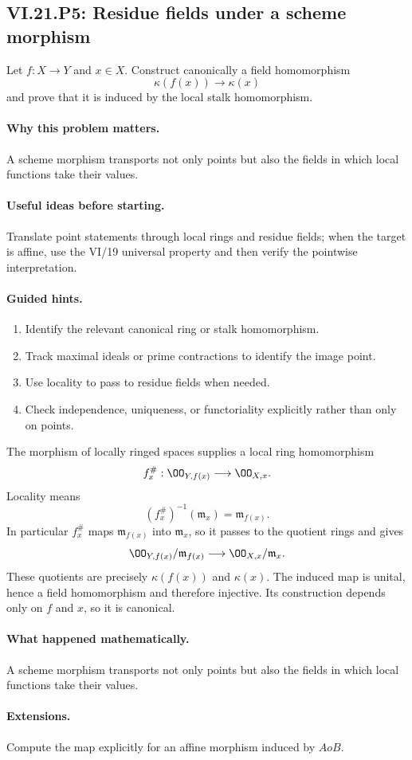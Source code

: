 \subsection*{VI.21.P5: Residue fields under a scheme morphism}
\begin{problem}\label{prob:vi21-p05}
Let $f:X\to Y$ and $x\in X$.  Construct canonically a field homomorphism
\[
\kappa(f(x))\longrightarrow\kappa(x)
\]
and prove that it is induced by the local stalk homomorphism.
\end{problem}

\ifdefined\FullProblemDossiers
\paragraph{Why this problem matters.}
A scheme morphism transports not only points but also the fields in which local functions take their values.

\paragraph{Useful ideas before starting.}
Translate point statements through local rings and residue fields; when the target is affine, use the VI/19 universal property and then verify the pointwise interpretation.

\paragraph{Guided hints.}
\begin{enumerate}
\item Identify the relevant canonical ring or stalk homomorphism.
\item Track maximal ideals or prime contractions to identify the image point.
\item Use locality to pass to residue fields when needed.
\item Check independence, uniqueness, or functoriality explicitly rather than only on points.
\end{enumerate}

\begin{solution}
The morphism of locally ringed spaces supplies a local ring homomorphism
\[
f_x^\#:\OO_{Y,f(x)}\longrightarrow\OO_{X,x}.
\]
Locality means
\[
(f_x^\#)^{-1}(\mathfrak m_x)=\mathfrak m_{f(x)}.
\]
In particular $f_x^\#$ maps $\mathfrak m_{f(x)}$ into $\mathfrak m_x$, so it passes to the quotient
rings and gives
\[
\OO_{Y,f(x)}/\mathfrak m_{f(x)}
\longrightarrow
\OO_{X,x}/\mathfrak m_x.
\]
These quotients are precisely $\kappa(f(x))$ and $\kappa(x)$.  The induced map is unital, hence a
field homomorphism and therefore injective.  Its construction depends only on $f$ and $x$, so it is
canonical.
\end{solution}

\paragraph{What happened mathematically.}
A scheme morphism transports not only points but also the fields in which local functions take their values.

\paragraph{Extensions.}
Compute the map explicitly for an affine morphism induced by $A	o B$.
\fi
